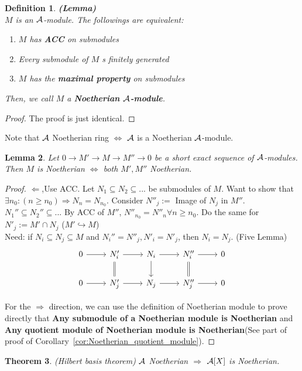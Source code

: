 \documentclass[11pt]{article}
\newtheorem{thm}{Theorem}[section]
\newtheorem{lemma}[thm]{Lemma}
\newtheorem{dfn}[thm]{Definition}
\newcommand{\cala}{{\cal A}}
\newcommand{\Lrta}{\Longrightarrow}
\newcommand{\lrta}{\longrightarrow}
\newcommand{\Llta}{\Longleftarrow}
\newcommand{\Llrta}{\Longleftrightarrow}
\newcommand{\inj}{\hookrightarrow}
\begin{document}
\begin{dfn}\textbf{(Lemma)}\\
$M$ is an $\cala$-module. The followings are equivalent:
\begin{enumerate}[label=(\alph*)]
\item $M$ has \textbf{ACC} on submodules
\item Every submodule of $M$ s finitely generated
\item $M$ has the \textbf{maximal property} on submodules
\end{enumerate}
Then, we call $M$ a \textbf{Noetherian $\cala$-module}.
\end{dfn}
\begin{proof}
The proof is just identical.
\end{proof}

Note that $\cala$ Noetherian ring $\Llrta $ $\cala$ is a Noetherian $\cala$-module.

\begin{lemma}\label{lem:SES_Noetherian}
Let $0\lrta M'\lrta M\lrta M''\lrta 0$ be a short exact sequence of $\cala$-modules. Then $M$ is Noetherian $\Llrta $ both $M', M''$ Noetherian.
\end{lemma}
\begin{proof}
$\Llta$,Use ACC. Let $N_1\subseteq N_2\subseteq ...$ be submodules of $M$. Want to show that $\exists n_0 :(n\geq n_0)\Lrta N_n=N_{n_0}$.
Consider $N''_j:=$ Image of $N_j$ in $M''$. $ N_1''\subseteq N_2''\subseteq ...$ By ACC of $M''$, $N''_{n_0}=N''_{n}\forall n\geq n_0$. Do the same for $N'_j:=M'\cap N_j$ ($M'\inj M$)\\
Need: if $N_i\subseteq N_j\subseteq M$ and $N_i''=N''_j, N'_i=N'_j$, then $N_i=N_j$. (Five Lemma)
\[
\begin{tikzcd}
0\ar[r] & N_i'\ar[r]\ar[d,equal] & N_i\ar[r]\ar[d] & N_i''\ar[r]\ar[d,equal] & 0\\
0\ar[r] & N_j'\ar[r] & N_j\ar[r] & N_j''\ar[r] & 0
\end{tikzcd}
\]

For the $\Lrta$ direction, we can use the definition of Noetherian module to prove directly that \textbf{Any submodule of a Noetherian module is Noetherian} and \textbf{Any quotient module of Noetherian module is Noetherian}(See part of proof of Corollary~\ref{cor:Noetherian_quotient_module}).
\end{proof}

\begin{thm}\label{thm:Hilbert_Basis}(Hilbert basis theorem)
$\cala$ Noetherian $\Lrta $ $\cala[X]$ is Noetherian.
\end{thm}
\end{document}
